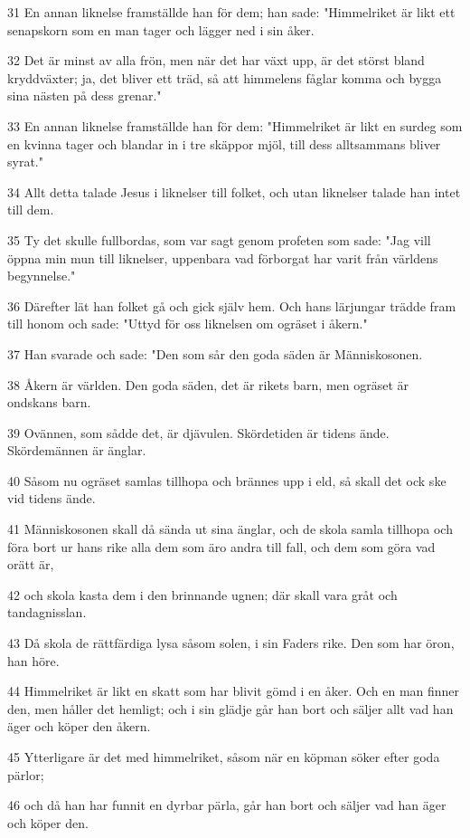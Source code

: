 \par 31 En annan liknelse framställde han för dem; han sade: "Himmelriket är likt ett senapskorn som en man tager och lägger ned i sin åker.
\par 32 Det är minst av alla frön, men när det har växt upp, är det störst bland kryddväxter; ja, det bliver ett träd, så att himmelens fåglar komma och bygga sina nästen på dess grenar."
\par 33 En annan liknelse framställde han för dem: "Himmelriket är likt en surdeg som en kvinna tager och blandar in i tre skäppor mjöl, till dess alltsammans bliver syrat."
\par 34 Allt detta talade Jesus i liknelser till folket, och utan liknelser talade han intet till dem.
\par 35 Ty det skulle fullbordas, som var sagt genom profeten som sade: "Jag vill öppna min mun till liknelser, uppenbara vad förborgat har varit från världens begynnelse."
\par 36 Därefter lät han folket gå och gick själv hem. Och hans lärjungar trädde fram till honom och sade: "Uttyd för oss liknelsen om ogräset i åkern."
\par 37 Han svarade och sade: "Den som sår den goda säden är Människosonen.
\par 38 Åkern är världen. Den goda säden, det är rikets barn, men ogräset är ondskans barn.
\par 39 Ovännen, som sådde det, är djävulen. Skördetiden är tidens ände. Skördemännen är änglar.
\par 40 Såsom nu ogräset samlas tillhopa och brännes upp i eld, så skall det ock ske vid tidens ände.
\par 41 Människosonen skall då sända ut sina änglar, och de skola samla tillhopa och föra bort ur hans rike alla dem som äro andra till fall, och dem som göra vad orätt är,
\par 42 och skola kasta dem i den brinnande ugnen; där skall vara gråt och tandagnisslan.
\par 43 Då skola de rättfärdiga lysa såsom solen, i sin Faders rike. Den som har öron, han höre.
\par 44 Himmelriket är likt en skatt som har blivit gömd i en åker. Och en man finner den, men håller det hemligt; och i sin glädje går han bort och säljer allt vad han äger och köper den åkern.
\par 45 Ytterligare är det med himmelriket, såsom när en köpman söker efter goda pärlor;
\par 46 och då han har funnit en dyrbar pärla, går han bort och säljer vad han äger och köper den.
